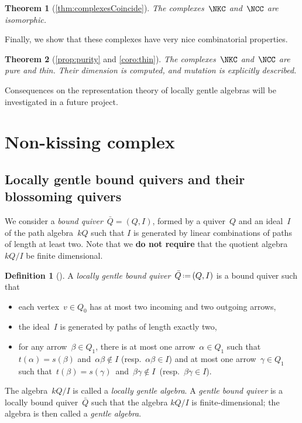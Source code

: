 \documentclass{amsart}
\newtheorem*{theorem*}{Theorem}%
\theoremstyle{definition}
\newtheorem{definition}[theorem]{Definition}
\newcommand{\eqdef}{\mbox{\,\raisebox{0.2ex}{\scriptsize\ensuremath{\mathrm:}}\ensuremath{=}\,}} %
\newcommand{\darkblue}{\color{darkblue}} %
\newcommand{\defn}[1]{\textsl{\darkblue #1}} %
\begin{document}
\begin{theorem*}[\ref{thm:complexesCoincide}]
 The complexes~$\NKC$ and~$\NCC$ are isomorphic.
\end{theorem*}

Finally, we show that these complexes have very nice combinatorial properties.

\begin{theorem*}[\ref{prop:purity} and \ref{coro:thin}]
 The complexes~$\NKC$ and~$\NCC$ are pure and thin.  Their dimension is computed, and mutation is explicitly described.
\end{theorem*}

Consequences on the representation theory of locally gentle algebras will be investigated in a future project.

\section{Non-kissing complex}\label{sec:nonKissingComplex}

\subsection{Locally gentle bound quivers and their blossoming quivers}

We consider a \defn{bound quiver}~$\bar Q = (Q,I)$, formed by a quiver~$Q$ and an ideal~$I$ of the path algebra~$kQ$ such that $I$ is generated by linear combinations of paths of length at least two.
Note that we \textbf{do not require} that the quotient algebra~$kQ/I$ be finite dimensional.

\begin{definition}[\cite{ButlerRingel}]
\label{def:gentleQuiver}
A \defn{locally gentle bound quiver}~$\bar Q \eqdef (Q,I)$ is a bound quiver such that
\begin{itemize}
\item each vertex~$v \in Q_0$ has at most two incoming and two outgoing arrows,
\item the ideal~$I$ is generated by paths of length exactly two,
\item for any arrow~$\beta \in Q_1$, there is at most one arrow~$\alpha \in Q_1$ such that~$t(\alpha) = s(\beta)$ and~${\alpha\beta\notin I}$ (resp.~$\alpha\beta \in I$) and at most one arrow~$\gamma \in Q_1$ such that~$t(\beta) = s(\gamma)$~and~${\beta\gamma\notin I}$~(resp.~${\beta\gamma \in I}$).
\end{itemize}
The algebra~$kQ/I$ is called a \defn{locally gentle algebra}.
A \defn{gentle bound quiver} is a locally bound quiver~$\bar Q$ such that the algebra $kQ/I$ is finite-dimensional; the algebra is then called a \defn{gentle algebra}.
\end{definition}
\end{document}
